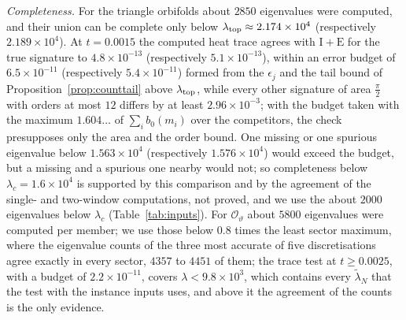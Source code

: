 \documentclass[pdflatex,sn-mathphys-num]{sn-jnl}
\theoremstyle{thmstyleone}%
\theoremstyle{thmstylethree}%
\newcommand{\Orb}{\mathcal{O}}
\begin{document}
\emph{Completeness.} For the triangle orbifolds about $2850$ eigenvalues were computed, and their union can be complete only below $\lambda_{\rm top}\approx2.174\times10^4$ (respectively $2.189\times10^4$). At $t=0.0015$ the computed heat trace agrees with $\mathrm I+\mathrm E$ for the true signature to $4.8\times10^{-13}$ (respectively $5.1\times10^{-13}$), within an error budget of $6.5\times10^{-11}$ (respectively $5.4\times10^{-11}$) formed from the $\epsilon_j$ and the tail bound of Proposition~\ref{prop:counttail} above $\lambda_{\rm top}$, while every other signature of area $\frac\pi2$ with orders at most $12$ differs by at least $2.96\times10^{-3}$; with the budget taken with the maximum $1.604\ldots$ of $\sum_ib_0(m_i)$ over the competitors, the check presupposes only the area and the order bound. One missing or one spurious eigenvalue below $1.563\times10^4$ (respectively $1.576\times10^4$) would exceed the budget, but a missing and a spurious one nearby would not; so completeness below $\lambda_c=1.6\times10^4$ is supported by this comparison and by the agreement of the single- and two-window computations, not proved, and we use the about $2000$ eigenvalues below $\lambda_c$ (Table~\ref{tab:inputs}). For $\Orb_\vartheta$ about $5800$ eigenvalues were computed per member; we use those below $0.8$ times the least sector maximum, where the eigenvalue counts of the three most accurate of five discretisations agree exactly in every sector, $4357$ to $4451$ of them; the trace test at $t\ge0.0025$, with a budget of $2.2\times10^{-11}$, covers $\lambda<9.8\times10^3$, which contains every $\tilde\lambda_N$ that the test with the instance inputs uses, and above it the agreement of the counts is the only evidence.
\end{document}
